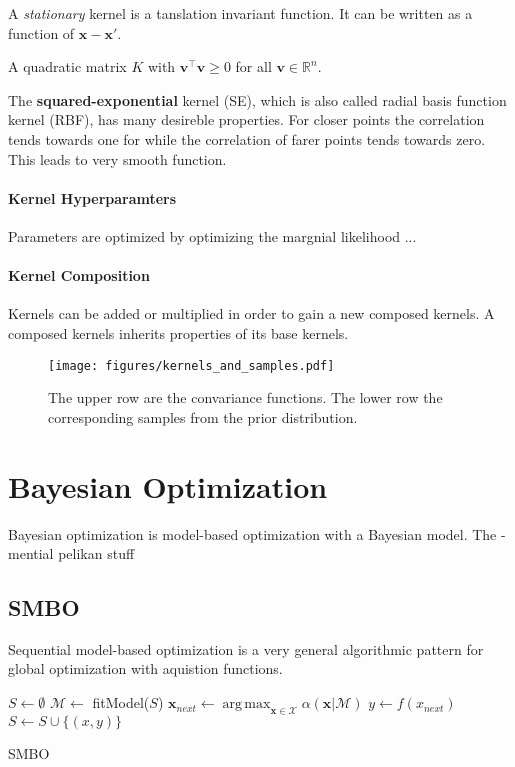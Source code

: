 \documentclass[english]{article}
\newcommand{\x}{\mathbf{x}}
\newcommand{\M}{\mathcal{M}}
\newcommand{\X}{\mathcal{X}}
\DeclareMathOperator*{\argmax}{arg\,max}
\begin{document}
A \textit{stationary} kernel is a tanslation invariant function. It can be written as a function of $\x-\x'$.

A quadratic matrix $K$ with $\mathbf{v}^\top \mathbf{v} \ge 0$ for all $\mathbf{v} \in \mathbb{R}^n$.

The \textbf{squared-exponential} kernel (SE), which is also called radial basis function kernel (RBF), has many desireble properties. For closer points the correlation tends towards one for while the correlation of farer points tends towards zero. This leads to very smooth function.

\paragraph{Kernel Hyperparamters}
Parameters are optimized by optimizing the margnial likelihood ...

\paragraph{Kernel Composition}
Kernels can be added or multiplied in order to gain a new composed kernels. A composed kernels inherits properties of its base kernels.

\begin{figure}
  \texttt{[image: figures/kernels\_and\_samples.pdf]}
  \caption{The upper row are the convariance functions. The lower row the corresponding samples from the prior distribution.}
  \label{kernels_and_samples}
\end{figure}




\section{Bayesian Optimization}
Bayesian optimization is model-based optimization with a Bayesian model. The
- mential pelikan stuff

\subsection{SMBO}
Sequential model-based optimization is a very general algorithmic pattern for global optimization with aquistion functions.

\begin{algorithm}[H]
\SetAlgoLined

$S \leftarrow \emptyset$\;
{
  $\mathcal{M} \leftarrow$ fitModel($S$)\;
  $\x_{next} \leftarrow \argmax_{\x \in \X} \alpha(\x|\M)$\;
  $y \leftarrow f(x_{next})$\;
  $S \leftarrow S \cup \{(x,y)\}$\;
}
\caption{SMBO}
\end{algorithm}
\end{document}
